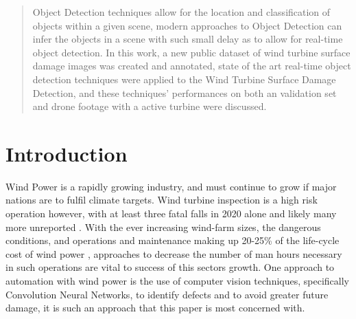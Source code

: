 \documentclass[conference]{IEEEtran}
\begin{document}
\maketitle

\begin{abstract}

Object Detection techniques allow for the location and classification of objects within a given scene, modern approaches to Object Detection can infer the objects in a scene with such small delay as to allow for real-time object detection. In this work, a new public dataset of wind turbine surface damage images was created and annotated, state of the art real-time object detection techniques were applied to the Wind Turbine Surface Damage Detection, and these techniques' performances on both an validation set and drone footage with a active turbine were discussed.

\end{abstract}


%
\IEEEpeerreviewmaketitle



\section{Introduction}
Wind Power is a rapidly growing industry, and must continue to grow if major nations are to fulfil climate targets. Wind turbine inspection is a high risk operation however, with at least three fatal falls in 2020 alone and likely many more unreported \cite{big}\cite{finnish}\cite{calexico}. With the ever increasing wind-farm sizes, the dangerous conditions, and operations and maintenance making up 20-25\% of the life-cycle cost of wind power \cite{STEFFEN2020359}, approaches to decrease the number of man hours necessary in such operations are vital to success of this sectors growth. One approach to automation with wind power is the use of computer vision techniques, specifically Convolution Neural Networks, to identify defects and to avoid greater future damage, it is such an approach that this paper is most concerned with. 
\end{document}
